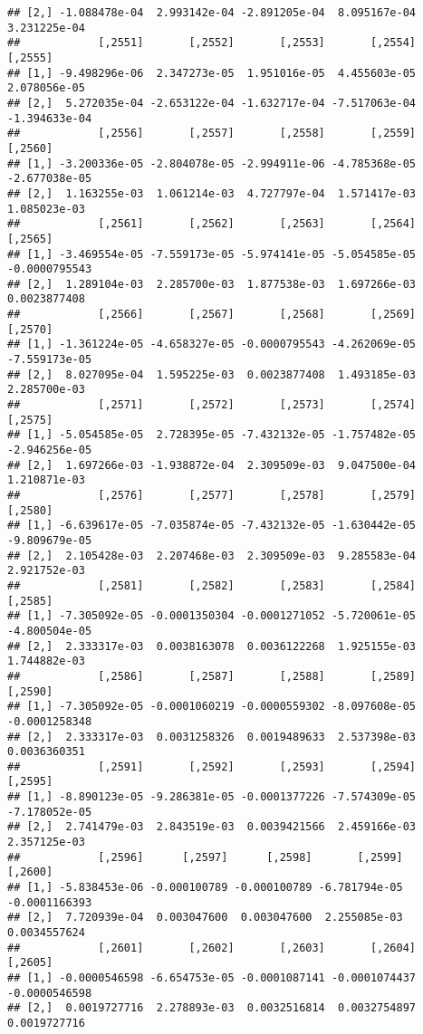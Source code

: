 \documentclass[
]{article}
\begin{document}
\begin{verbatim}
## [2,] -1.088478e-04  2.993142e-04 -2.891205e-04  8.095167e-04  3.231225e-04
##            [,2551]       [,2552]       [,2553]       [,2554]       [,2555]
## [1,] -9.498296e-06  2.347273e-05  1.951016e-05  4.455603e-05  2.078056e-05
## [2,]  5.272035e-04 -2.653122e-04 -1.632717e-04 -7.517063e-04 -1.394633e-04
##            [,2556]       [,2557]       [,2558]       [,2559]       [,2560]
## [1,] -3.200336e-05 -2.804078e-05 -2.994911e-06 -4.785368e-05 -2.677038e-05
## [2,]  1.163255e-03  1.061214e-03  4.727797e-04  1.571417e-03  1.085023e-03
##            [,2561]       [,2562]       [,2563]       [,2564]       [,2565]
## [1,] -3.469554e-05 -7.559173e-05 -5.974141e-05 -5.054585e-05 -0.0000795543
## [2,]  1.289104e-03  2.285700e-03  1.877538e-03  1.697266e-03  0.0023877408
##            [,2566]       [,2567]       [,2568]       [,2569]       [,2570]
## [1,] -1.361224e-05 -4.658327e-05 -0.0000795543 -4.262069e-05 -7.559173e-05
## [2,]  8.027095e-04  1.595225e-03  0.0023877408  1.493185e-03  2.285700e-03
##            [,2571]       [,2572]       [,2573]       [,2574]       [,2575]
## [1,] -5.054585e-05  2.728395e-05 -7.432132e-05 -1.757482e-05 -2.946256e-05
## [2,]  1.697266e-03 -1.938872e-04  2.309509e-03  9.047500e-04  1.210871e-03
##            [,2576]       [,2577]       [,2578]       [,2579]       [,2580]
## [1,] -6.639617e-05 -7.035874e-05 -7.432132e-05 -1.630442e-05 -9.809679e-05
## [2,]  2.105428e-03  2.207468e-03  2.309509e-03  9.285583e-04  2.921752e-03
##            [,2581]       [,2582]       [,2583]       [,2584]       [,2585]
## [1,] -7.305092e-05 -0.0001350304 -0.0001271052 -5.720061e-05 -4.800504e-05
## [2,]  2.333317e-03  0.0038163078  0.0036122268  1.925155e-03  1.744882e-03
##            [,2586]       [,2587]       [,2588]       [,2589]       [,2590]
## [1,] -7.305092e-05 -0.0001060219 -0.0000559302 -8.097608e-05 -0.0001258348
## [2,]  2.333317e-03  0.0031258326  0.0019489633  2.537398e-03  0.0036360351
##            [,2591]       [,2592]       [,2593]       [,2594]       [,2595]
## [1,] -8.890123e-05 -9.286381e-05 -0.0001377226 -7.574309e-05 -7.178052e-05
## [2,]  2.741479e-03  2.843519e-03  0.0039421566  2.459166e-03  2.357125e-03
##            [,2596]      [,2597]      [,2598]       [,2599]       [,2600]
## [1,] -5.838453e-06 -0.000100789 -0.000100789 -6.781794e-05 -0.0001166393
## [2,]  7.720939e-04  0.003047600  0.003047600  2.255085e-03  0.0034557624
##            [,2601]       [,2602]       [,2603]       [,2604]       [,2605]
## [1,] -0.0000546598 -6.654753e-05 -0.0001087141 -0.0001074437 -0.0000546598
## [2,]  0.0019727716  2.278893e-03  0.0032516814  0.0032754897  0.0019727716

\end{verbatim}
\end{document}
